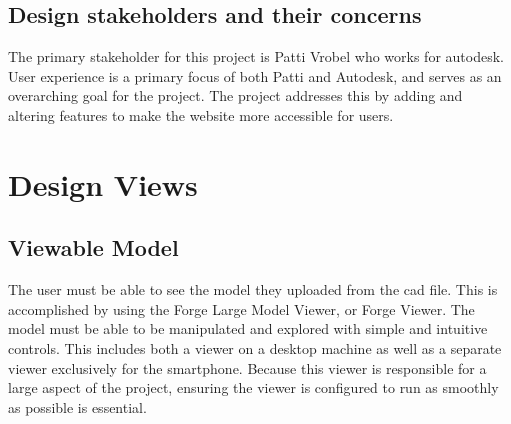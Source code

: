 \documentclass[letterpaper, 10pt, draftclsnofoot, compsoc, onecolumn]{IEEEtran}
\begin{document}
\subsection{Design stakeholders and their concerns}
	The primary stakeholder for this project is Patti Vrobel who works for autodesk. User experience is a primary focus of both Patti and Autodesk, and serves as an overarching goal for the project. The project addresses this by adding and altering features to make the website more accessible for users.

\section{Design Views}

\subsection{Viewable Model}
The user must be able to see the model they uploaded from the cad file. This is accomplished by using the Forge Large Model Viewer, or Forge Viewer. The model must be able to be manipulated and explored with simple and intuitive controls. This includes both a viewer on a desktop machine as well as a separate viewer exclusively for the smartphone. Because this viewer is responsible for a large aspect of the project, ensuring the viewer is configured to run as smoothly as possible is essential.
\end{document}
